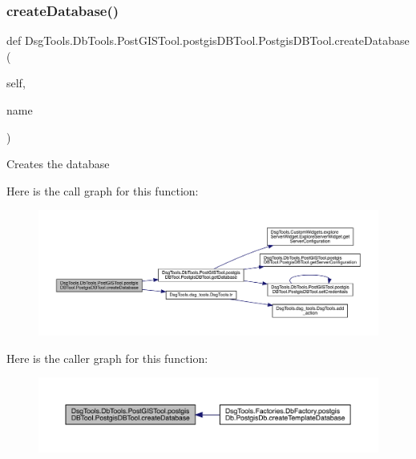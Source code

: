 \subsubsection{\texorpdfstring{create\+Database()}{createDatabase()}}
{\footnotesize\ttfamily def Dsg\+Tools.\+Db\+Tools.\+Post\+G\+I\+S\+Tool.\+postgis\+D\+B\+Tool.\+Postgis\+D\+B\+Tool.\+create\+Database (\begin{DoxyParamCaption}\item[{}]{self,  }\item[{}]{name }\end{DoxyParamCaption})}

\begin{DoxyVerb}Creates the database
\end{DoxyVerb}
 Here is the call graph for this function\+:
\nopagebreak
\begin{figure}[H]
\begin{center}
\leavevmode
\includegraphics[width=350pt]{class_dsg_tools_1_1_db_tools_1_1_post_g_i_s_tool_1_1postgis_d_b_tool_1_1_postgis_d_b_tool_ace7579b7cb8b1d20e7f25053f06b60cb_cgraph}
\end{center}
\end{figure}
Here is the caller graph for this function\+:
\nopagebreak
\begin{figure}[H]
\begin{center}
\leavevmode
\includegraphics[width=350pt]{class_dsg_tools_1_1_db_tools_1_1_post_g_i_s_tool_1_1postgis_d_b_tool_1_1_postgis_d_b_tool_ace7579b7cb8b1d20e7f25053f06b60cb_icgraph}
\end{center}
\end{figure}
\mbox{\label{class_dsg_tools_1_1_db_tools_1_1_post_g_i_s_tool_1_1postgis_d_b_tool_1_1_postgis_d_b_tool_a26ad4391d1bd02ea5d91f99c762031c6}} 
